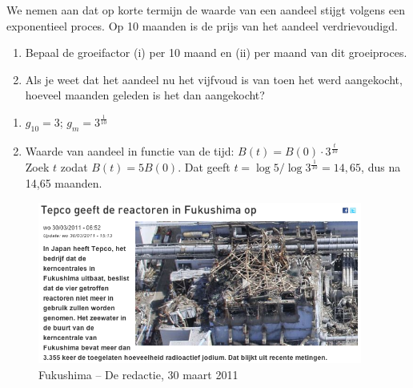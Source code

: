 \begin{oef}
We nemen aan dat op korte termijn de waarde van een aandeel stijgt
volgens een exponentieel  proces. Op 10 maanden is de prijs van
het aandeel verdrievoudigd.
\begin{enumerate}
  \item Bepaal de groeifactor (i) per 10 maand en (ii) per maand van dit groeiproces.
  \item Als je weet dat het aandeel nu het vijfvoud is van
        toen het werd aangekocht, hoeveel maanden geleden is het dan
        aangekocht?
\end{enumerate}
\begin{opl}
  \begin{enumerate}
    \item $g_{10}=3$; $g_m=3^\frac{1}{10}$
    \item Waarde van aandeel in functie van de tijd: $B(t)=B(0)\cdot 3^\frac{t}{10}$ \\
          Zoek $t$ zodat $B(t)=5B(0)$. Dat geeft $t=\log5/\log3^\frac{1}{10}=14,65$, dus na 14,65 maanden.
  \end{enumerate}
\end{opl}
\end{oef}

 
\begin{figure}[hbtp]
  \flushright
  \includegraphics[width=0.95\textwidth]{oefeningen/jodiumderedactie.png}
  \caption{Fukushima -- De redactie, 30 maart 2011}
  \label{fig:fukushima} 
\end{figure}    

